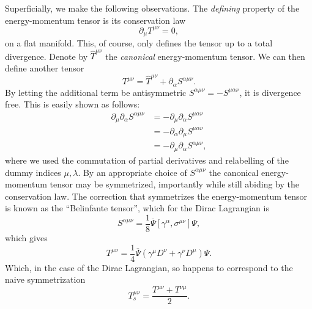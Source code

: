 Superficially, we make the following observations.
The \emph{defining} property of the energy-momentum tensor is its conservation law
\begin{equation}
  \label{eq:78}
  \partial_{\mu} T^{\mu \nu} = 0,
\end{equation}
on a flat manifold.
This, of course, only defines the tensor up to a total divergence.
Denote by \( \hat{T}^{\mu \nu} \) the \emph{canonical} energy-momentum tensor.
We can then define another tensor
\begin{equation}
  \label{eq:79}
  T^{\mu\nu} = \hat{T}^{\mu \nu} + \partial_{\alpha} S^{\alpha \mu \nu}.
\end{equation}
By letting the additional term be antisymmetric \( S^{\alpha \mu \nu} = - S^{\mu \alpha \nu}\), it is divergence free.
This is easily shown as follows:
\begin{align}
  \label{eq:80}
  \partial_{\mu} \partial_{\alpha} S^{\alpha \mu \nu} &= - \partial_{\mu} \partial_{\alpha} S^{\mu \alpha \nu}\\
                                                        &= - \partial_{\alpha} \partial_{\mu} S^{\mu \alpha \nu}\\
  &= -\partial_{\mu} \partial_{\alpha} S^{\alpha \mu \nu},
\end{align}
where we used the commutation of partial derivatives and relabelling of the dummy indices \( \mu, \lambda \).
By an appropriate choice of \( S^{\alpha \mu \nu} \) the canonical energy-momentum tensor may be symmetrized, importantly while still abiding by the conservation law.
The correction that symmetrizes the energy-momentum tensor is known as the ``Belinfante tensor'', which for the Dirac Lagrangian is\cite{chernodubThermalTransportGeometry2021}
\begin{equation}
  \label{eq:81}
  S^{\alpha \mu \nu} = \frac{1}{8} \bar{\Psi}\left[ \gamma^{\alpha}, \sigma^{\mu\nu} \right] \Psi,
\end{equation}
which gives
\begin{equation}
  \label{eq:82}
  T^{\mu \nu} = \frac{1}{4} \bar{\Psi} (\gamma^{\mu} D^{\nu} + \gamma^{\nu} D^{\mu}) \Psi.
\end{equation}
Which, in the case of the Dirac Lagrangian, so happens to correspond to the naive symmetrization
\begin{equation}
  \label{eq:83}
  T^{\mu\nu}_s = \frac{T^{\mu \nu} + T^{\nu \mu}}{2}.
\end{equation}

